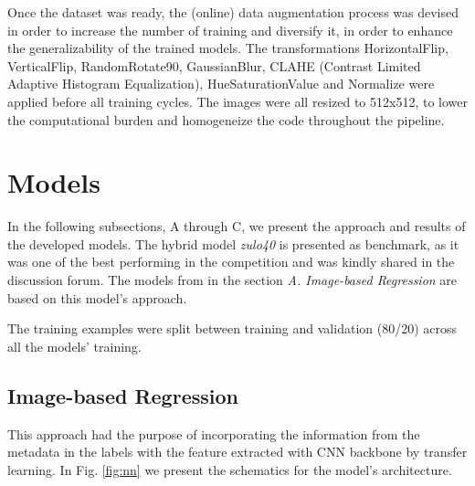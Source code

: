 \documentclass[conference]{IEEEtran}
\begin{document}


Once the dataset was ready, the (online) data augmentation process was devised in order to increase the number of training and diversify it, in order to enhance the generalizability of the trained models. The transformations HorizontalFlip, VerticalFlip, RandomRotate90, GaussianBlur, CLAHE (Contrast Limited Adaptive Histogram Equalization), HueSaturationValue and Normalize were applied before all training cycles. The images were all resized to 512x512, to lower the computational burden and homogeneize the code throughout the pipeline. 

\section{Models}

In the following subsections, A through C, we present the approach and results of the developed models. The hybrid model \textit{zulo40} is presented as benchmark, as it was one of the best performing in the competition and was kindly shared in the discussion forum. The models from in the section \textit{A. Image-based Regression} are based on this model's approach.

The training examples were split between training and validation (80/20) across all the models' training.

\subsection{Image-based Regression}

This approach had the purpose of incorporating the information from the metadata in the labels with the feature extracted with CNN backbone by transfer learning. In Fig. \ref{fig:nn} we present the schematics for the model's architecture.
\end{document}
